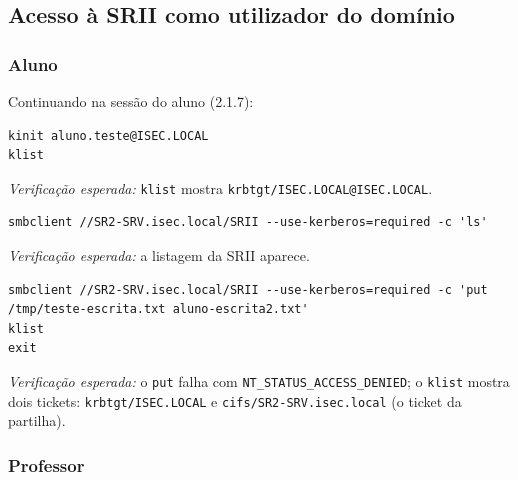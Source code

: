 
\subsection[Acesso à SRII como utilizador do domínio]{Acesso à SRII como utilizador do domínio}


\subsubsection[Aluno]{Aluno}


Continuando na sessão do aluno (2.1.7):

\begin{lstlisting}[style=bashstyle]
kinit aluno.teste@ISEC.LOCAL
klist
\end{lstlisting}

\emph{Verificação esperada:} \texttt{klist} mostra \texttt{krbtgt/\allowbreak{}ISEC.LOCAL@ISEC.LOCAL}.


\begin{lstlisting}[style=bashstyle]
smbclient //SR2-SRV.isec.local/SRII --use-kerberos=required -c 'ls'
\end{lstlisting}

\emph{Verificação esperada:} a listagem da SRII aparece.


\begin{lstlisting}[style=bashstyle]
smbclient //SR2-SRV.isec.local/SRII --use-kerberos=required -c 'put /tmp/teste-escrita.txt aluno-escrita2.txt'
klist
exit
\end{lstlisting}

\emph{Verificação esperada:} o \texttt{put} falha com \texttt{NT\_STATUS\_ACCESS\_DENIED}; o \texttt{klist} mostra dois tickets: \texttt{krbtgt/\allowbreak{}ISEC.LOCAL} e \texttt{cifs/\allowbreak{}SR2-SRV.isec.local} (o ticket da partilha).

\subsubsection[Professor]{Professor}


